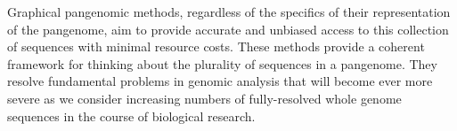 

Graphical pangenomic methods, regardless of the specifics of their representation of the pangenome, aim to provide accurate and unbiased access to this collection of sequences with minimal resource costs.
These methods provide a coherent framework for thinking about the plurality of sequences in a pangenome.
They resolve fundamental problems in genomic analysis that will become ever more severe as we consider increasing numbers of fully-resolved whole genome sequences in the course of biological research.










